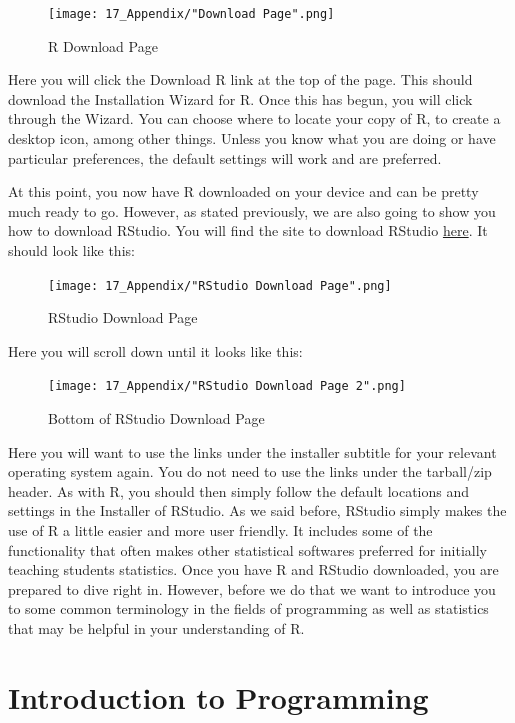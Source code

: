 \documentclass[11pt,openany]{book}\usepackage[]{graphicx}\usepackage[]{color}
\begin{document}
\begin{figure}[h]
\centering
\texttt{[image: 17\_Appendix/"Download Page".png]}
\caption{R Download Page
\label{fig:rdp}}
\end{figure}

Here you will click the Download R link at the top of the page. This should download the Installation Wizard for R. Once this has begun, you will click through the Wizard. You can choose where to locate your copy of R, to create a desktop icon, among other things. Unless you know what you are doing or have particular preferences, the default settings will work and are preferred. 

At this point, you now have R downloaded on your device and can be pretty much ready to go. However, as stated previously, we are also going to show you how to download RStudio. You will find the site to download RStudio \href{https://www.rstudio.com/products/rstudio/download2/}{here}. It should look like this: 

\begin{figure}[h]
\centering
\texttt{[image: 17\_Appendix/"RStudio Download Page".png]}
\caption{RStudio Download Page 
\label{fig:rsdp}}
\end{figure}

Here you will scroll down until it looks like this: 

\begin{figure}[h]
\centering
\texttt{[image: 17\_Appendix/"RStudio Download Page 2".png]}
\caption{Bottom of RStudio Download Page 
\label{fig:brsdp}}
\end{figure}

Here you will want to use the links under the installer subtitle for your relevant operating system again. You do not need to use the links under the tarball/zip header. As with R, you should then simply follow the default locations and settings in the Installer of RStudio. As we said before, RStudio simply makes the use of R a little easier and more user friendly. It includes some of the functionality that often makes other statistical softwares preferred for initially teaching students statistics. Once you have R and RStudio downloaded, you are prepared to dive right in. However, before we do that we want to introduce you to some common terminology in the fields of programming as well as statistics that may be helpful in your understanding of R.

\section{Introduction to Programming}
\end{document}
